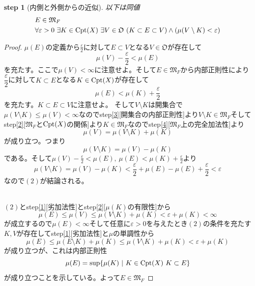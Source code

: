 \documentclass[leqno]{jsarticle}
\newtheorem{stp}{{\bf step}}
\newcommand{\To}{\Longrightarrow}
\newcommand{\mgn}{\infty}
\newcommand{\dpst}{\displaystyle}
\newcommand{\mf}{\mathfrak{M}_F}
\newcommand{\ep}{\varepsilon}
\newcommand{\cpt}{{\rm Cpt}(X)}
\newcommand{\oo}{\mathfrak{O}}
\begin{document}
\setcounter{equation}{0}
\begin{stp}[内側と外側からの近似]\label{5}
以下は同値
\begin{eqnarray}
&E\in\mf\\ 
&\forall \ep>0\ \exists K\in \cpt\ \exists V\in \oo\ (K\subset E\subset V)\land (\mu(V\setminus K)<\ep)
\end{eqnarray}
\end{stp}
\begin{proof}\par
[$(1)\To(2)$]\par 
$\mu(E)$の定義から$\dpst \frac{\ep}{2}$に対して$E\subset V$となる$V\in \oo$が存在して
\[
\mu(V)-\frac{\ep}{2}<\mu(E)
\]
を充たす。ここで$\mu(V)<\mgn$に注意せよ。そして$E\in \mf$から内部正則性により$\dfrac{\ep}{2}$に対して$K\subset E$となる$K\in\cpt$が存在して
\[
\mu(E)<\mu(K)+\frac{\ep}{2}
\]
を充たす。$K\subset E\subset V$に注意せよ。
そして$V\setminus K$は開集合で$\mu(V\setminus K)\le \mu(V)<\mgn$なのでstep\ref{3}[開集合の内部正則性]より$V\setminus K\in\mf$そしてstep\ref{2}[$\mf$と$\cpt$の関係]より$K\in \mf$なのでstep\ref{4}[$\mf$上の完全加法性]より
\[
\mu(V)=\mu(V\setminus K)+\mu(K)
\]
が成り立つ。つまり
\[
\mu(V\setminus K)=\mu(V)-\mu(K)
\]
である。そして$\mu(V)-\frac{\ep}{2}<\mu(E),\ \mu(E)<\mu(K)+\frac{\ep}{2}$より
\[
\mu(V\setminus K)=\mu(V)-\mu(K)<\frac{\ep}{2}+\mu(E)-\mu(E)+\frac{\ep}{2}<\ep
\]なので$(2)$が結論される。\par
[$(1)\To (2)$の証明終わり]\par
[$(2)\To(1)$]\\ 
$(2)$とstep\ref{1}[劣加法性]とstep\ref{2}[$\mu(K)$の有限性]から
\[
\mu(E)\le \mu(V)\le \mu(V\setminus K)+\mu(K)<\ep+\mu(K)<\mgn 
\]
が成立するので$\mu(E)<\mgn$そして任意に$\ep>0$を与えたとき$(2)$の条件を充たす$K,V$が存在してstep\ref{1}[劣加法性]と$\mu$の単調性から
\[
\mu(E)\le \mu(E\setminus K)+\mu(K)\le \mu(V\setminus K)+\mu(K)<\ep+\mu(K)
\]
が成り立つが、これは内部正則性
\[
\mu(E)=\sup\{\mu(K)\ |\ K\in \cpt\ K\subset E\}
\]
が成り立つことを示している。よって$E\in \mf$\par
[$(2)\To (1)$の証明終わり]
\end{proof}
\end{document}
